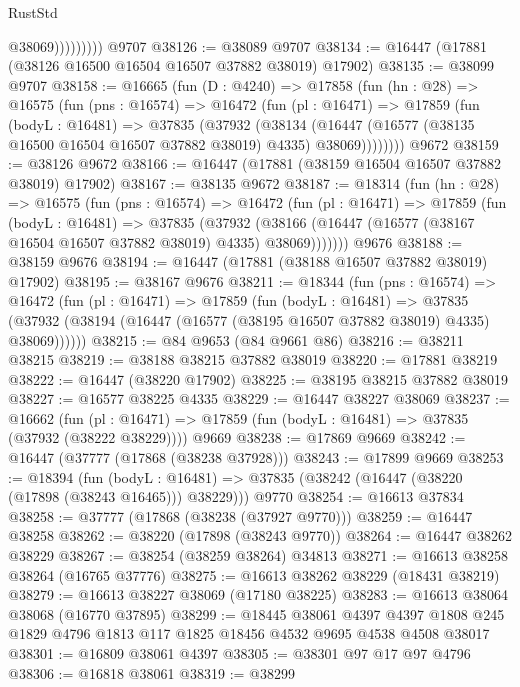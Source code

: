 \begin{lexlean}{RustStd}
\begin{coremodule}
{\begin{coremodule}
{{{{{{{{{{{{{{{{{{{{{{{{{{{{{{{{{{{{{{{{{{{{{{{{{{{{{{{                      @38069)))))))))
    @9707
@38126 := @38089 @9707
@38134 := @16447 (@17881 (@38126 @16500 @16504 @16507 @37882 @38019) @17902)
@38135 := @38099 @9707
@38158 := @16665
    (fun (D : @4240) =>
    @17858
      (fun (hn : @28) =>
      @16575
        (fun (pns : @16574) =>
        @16472
          (fun (pl : @16471) =>
          @17859
            (fun (bodyL : @16481) =>
            @37835
              (@37932
                (@38134
                  (@16447 (@16577 (@38135 @16500 @16504 @16507 @37882 @38019) @4335) @38069))))))))
    @9672
@38159 := @38126 @9672
@38166 := @16447 (@17881 (@38159 @16504 @16507 @37882 @38019) @17902)
@38167 := @38135 @9672
@38187 := @18314
    (fun (hn : @28) =>
    @16575
      (fun (pns : @16574) =>
      @16472
        (fun (pl : @16471) =>
        @17859
          (fun (bodyL : @16481) =>
          @37835
            (@37932
              (@38166 (@16447 (@16577 (@38167 @16504 @16507 @37882 @38019) @4335) @38069)))))))
    @9676
@38188 := @38159 @9676
@38194 := @16447 (@17881 (@38188 @16507 @37882 @38019) @17902)
@38195 := @38167 @9676
@38211 := @18344
    (fun (pns : @16574) =>
    @16472
      (fun (pl : @16471) =>
      @17859
        (fun (bodyL : @16481) =>
        @37835 (@37932 (@38194 (@16447 (@16577 (@38195 @16507 @37882 @38019) @4335) @38069))))))
@38215 := @84 @9653 (@84 @9661 @86)
@38216 := @38211 @38215
@38219 := @38188 @38215 @37882 @38019
@38220 := @17881 @38219
@38222 := @16447 (@38220 @17902)
@38225 := @38195 @38215 @37882 @38019
@38227 := @16577 @38225 @4335
@38229 := @16447 @38227 @38069
@38237 := @16662
    (fun (pl : @16471) => @17859 (fun (bodyL : @16481) => @37835 (@37932 (@38222 @38229))))
    @9669
@38238 := @17869 @9669
@38242 := @16447 (@37777 (@17868 (@38238 @37928)))
@38243 := @17899 @9669
@38253 := @18394
    (fun (bodyL : @16481) => @37835 (@38242 (@16447 (@38220 (@17898 (@38243 @16465))) @38229)))
    @9770
@38254 := @16613 @37834
@38258 := @37777 (@17868 (@38238 (@37927 @9770)))
@38259 := @16447 @38258
@38262 := @38220 (@17898 (@38243 @9770))
@38264 := @16447 @38262 @38229
@38267 := @38254 (@38259 @38264) @34813
@38271 := @16613 @38258 @38264 (@16765 @37776)
@38275 := @16613 @38262 @38229 (@18431 @38219)
@38279 := @16613 @38227 @38069 (@17180 @38225)
@38283 := @16613 @38064 @38068 (@16770 @37895)
@38299 := @18445
    @38061
    @4397
    @4397
    @1808
    @245
    @1829
    @4796
    @1813
    @117
    @1825
    @18456
    @4532
    @9695
    @4538
    @4508
    @38017
@38301 := @16809 @38061 @4397
@38305 := @38301 @97 @17 @97 @4796
@38306 := @16818 @38061
@38319 := @38299
}}}}}}}}}}}}}}}}}}}}}}}}}}}}}}}}}}}}}}}}}}}}}}}}}}}}}}}
\end{coremodule}}
\end{coremodule}
\end{lexlean}
